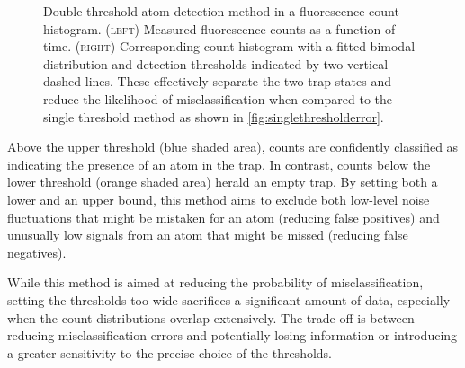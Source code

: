 \documentclass[../Thesis-IJspeert.tex]{subfiles}
\begin{document}
\begin{figure}[!t]
	\caption[Double-threshold atom detection method in a fluorescence count histogram.]{Double-threshold atom detection method in a fluorescence count histogram. \textsc{(left)} Measured fluorescence counts as a function of time. \textsc{(right)} Corresponding count histogram with a fitted bimodal distribution and detection thresholds indicated by two vertical dashed lines. These effectively separate the two trap states and reduce the likelihood of misclassification when compared to the single threshold method as shown in \autoref{fig:singlethresholderror}.}
	\label{fig:doublethreshold} 
\end{figure}
Above the upper threshold (blue shaded area), counts are confidently classified as indicating the presence of an atom in the trap. In contrast, counts below the lower threshold (orange shaded area) herald an empty trap. By setting both a lower and an upper bound, this method aims to exclude both low-level noise fluctuations that might be mistaken for an atom (reducing false positives) and unusually low signals from an atom that might be missed (reducing false negatives).

While this method is aimed at reducing the probability of misclassification, setting the thresholds too wide sacrifices a significant amount of data, especially when the count distributions overlap extensively. The trade-off is between reducing misclassification errors and potentially losing information or introducing a greater sensitivity to the precise choice of the thresholds.
\end{document}
